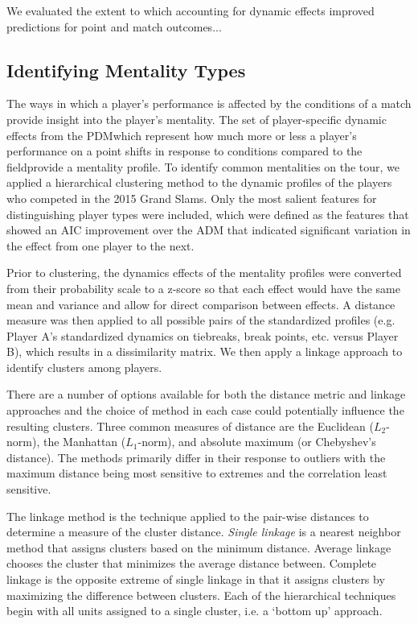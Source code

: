 \documentclass{Latex/svjour3}
\begin{document}
We evaluated the extent to which accounting for dynamic effects
improved predictions for point and match outcomes...



\subsection{Identifying Mentality Types}

The ways in which a player's performance is affected by the conditions
of a match provide insight into the player's mentality. The set of
player-specific dynamic effects from the PDM\textemdash which represent how much
more or less a player's performance on a point shifts in response to
conditions compared to the field\textemdash provide a mentality
profile. To identify common mentalities on the tour, we applied a
hierarchical clustering method to the dynamic profiles of the players
who competed in the 2015 Grand Slams. Only the most
salient features for distinguishing player types were included, which
were defined as the features that showed an AIC
improvement over the ADM that indicated significant variation in the effect from one player to the
next. 

Prior to clustering, the dynamics effects of the mentality profiles
were converted from their probability scale to a z-score so that each
effect would have the same mean and variance and allow for direct
comparison between effects. A distance measure was then applied to all
possible pairs of the standardized profiles (e.g. Player A's
standardized dynamics on tiebreaks, break points, etc. versus Player
B), which results in a dissimilarity matrix. We then apply a linkage
approach to identify clusters among players. 

There are a number of options available for both the distance metric
and linkage approaches and the choice of method in each case could potentially influence
the resulting clusters. Three common measures of distance are the
Euclidean ($L_2$-norm), the Manhattan ($L_1$-norm), and absolute
maximum (or Chebyshev's distance). The methods primarily differ in
their response to outliers with the maximum distance being most
sensitive to extremes and the correlation least sensitive.  

The linkage method is the technique applied to the pair-wise distances
to determine a measure of the cluster distance. \textit{Single
  linkage} is a nearest neighbor method that assigns clusters based on
the minimum distance. Average linkage chooses the cluster that
minimizes the average distance between. Complete linkage is the
opposite extreme of single linkage in that it assigns clusters by
maximizing the difference between clusters. Each of the hierarchical
techniques begin with all units assigned to a single cluster, i.e. a
`bottom up' approach. 
\end{document}
